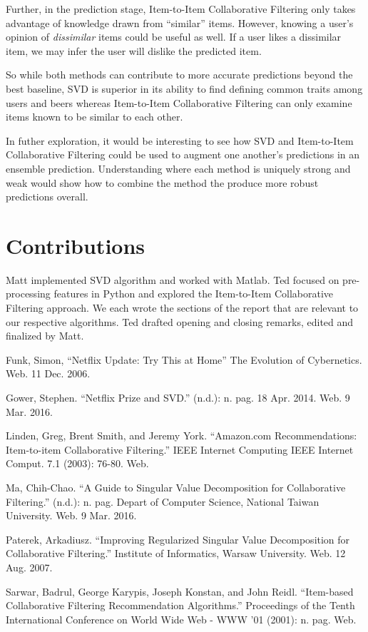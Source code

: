 \documentclass[12pt]{article}
\begin{document}
Further, in the prediction stage, Item-to-Item Collaborative Filtering only takes advantage of knowledge drawn from ``similar'' items. However, knowing a user's opinion of \textit{dissimilar} items could be useful as well. If a user likes a dissimilar item, we may infer the user will dislike the predicted item.

So while both methods can contribute to more accurate predictions beyond the best baseline, SVD is superior in its ability to find defining common traits among users and beers whereas Item-to-Item Collaborative Filtering can only examine items known to be similar to each other.

In futher exploration, it would be interesting to see how SVD and Item-to-Item Collaborative Filtering could be used to augment one another's predictions in an ensemble prediction. Understanding where each method is uniquely strong and weak would show how to combine the method the produce more robust predictions overall.

\section{Contributions}
Matt implemented SVD algorithm and worked with Matlab. Ted focused on pre-processing features in Python and explored the Item-to-Item Collaborative Filtering approach. We each wrote the sections of the report that are relevant to our respective algorithms. Ted drafted opening and closing remarks, edited and finalized by Matt.

\newpage
\begin{thebibliography}{9}

Funk, Simon, ``Netflix Update: Try This at Home'' The Evolution of Cybernetics. Web. 11 Dec. 2006.

Gower, Stephen. ``Netflix Prize and SVD.'' (n.d.): n. pag. 18 Apr. 2014. Web. 9 Mar. 2016.

Linden, Greg, Brent Smith, and Jeremy York. ``Amazon.com Recommendations: Item-to-item Collaborative Filtering.'' IEEE Internet Computing IEEE Internet Comput. 7.1 (2003): 76-80. Web.

Ma, Chih-Chao. ``A Guide to Singular Value Decomposition for Collaborative Filtering.'' (n.d.): n. pag. Depart of Computer Science, National Taiwan University. Web. 9 Mar. 2016.

Paterek, Arkadiusz. ``Improving Regularized Singular Value Decomposition for Collaborative Filtering.'' Institute of Informatics, Warsaw University. Web. 12 Aug. 2007.

Sarwar, Badrul, George Karypis, Joseph Konstan, and John Reidl. ``Item-based Collaborative Filtering Recommendation Algorithms.'' Proceedings of the Tenth International Conference on World Wide Web - WWW '01 (2001): n. pag. Web.

\end{thebibliography}
\end{document}
